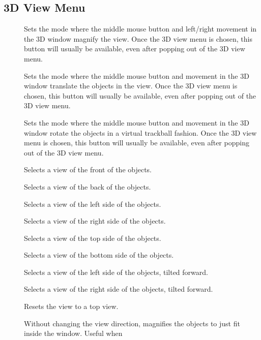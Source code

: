 \subsection{3D View Menu}

\begin{description}
\item[]
      Sets the mode where the middle mouse button and left/\-right movement
      in the 3D window magnify the view.
      Once the 3D view menu is chosen, this button will usually be
      available, even after popping out of the 3D view menu.
\item[]  
      Sets the mode where the middle mouse button and movement
      in the 3D window translate the objects in the view.
      Once the 3D view menu is chosen, this button will usually be
      available, even after popping out of the 3D view menu.
\item[]  Sets the mode where
      the middle mouse button and movement in the 3D window rotate
      the objects in a virtual trackball fashion.
      Once the 3D view menu is chosen, this button will usually be
      available, even after popping out of the 3D view menu.
\item[]  Selects a view of the front of
      the objects.
\item[]  Selects a view of the back of
      the objects.
\item[]  Selects a view of the left side of
      the objects.
\item[]  Selects a view of the right side of
      the objects.
\item[]  Selects a view of the top side of
      the objects.
\item[]  Selects a view of the bottom side of
      the objects.
\item[]  Selects a view of the left side of
      the objects, tilted forward.
\item[]  Selects a view of the right side of
      the objects, tilted forward.
\item[]  Resets the view to a top view.
\item[]  Without changing the view direction,
      magnifies the objects to just fit inside the window.  Useful when

\end{description}
